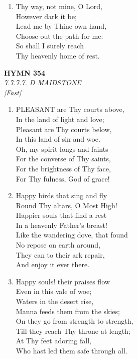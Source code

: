 \documentclass[11pt,a4paper]{article}
\begin{document}
\begin{enumerate}
    \item Thy way, not mine, O Lord, \\
        However dark it be; \\
        Lead me by Thine own hand, \\
        Choose out the path for me: \\
        So shall I surely reach \\
        Thy heavenly home of rest.

\end{enumerate}

\newpage
\begin{center}
    {\Large \textbf{HYMN 354}}
    \\
    \textit{7.7.7.7. D MAIDSTONE}
    \\
    \textit{\small [Fast]}
\end{center}
\vspace{1em}

\begin{enumerate}
    \item PLEASANT are Thy courts above, \\
        In the land of light and love; \\
        Pleasant are Thy courts below, \\
        In this land of sin and woe. \\
        Oh, my spirit longs and faints \\
        For the converse of Thy saints, \\
        For the brightness of Thy face, \\
        For Thy fulness, God of grace!

    \item Happy birds that sing and fly \\
        Round Thy altars, O Most High! \\
        Happier souls that find a rest \\
        In a heavenly Father's breast! \\
        Like the wandering dove, that found \\
        No repose on earth around, \\
        They can to their ark repair, \\
        And enjoy it ever there.

    \item Happy souls! their praises flow \\
        Even in this vale of woe; \\
        Waters in the desert rise, \\
        Manna feeds them from the skies; \\
        On they go from strength to strength, \\
        Till they reach Thy throne at length; \\
        At Thy feet adoring fall, \\
        Who hast led them safe through all.

\end{enumerate}
\end{document}
